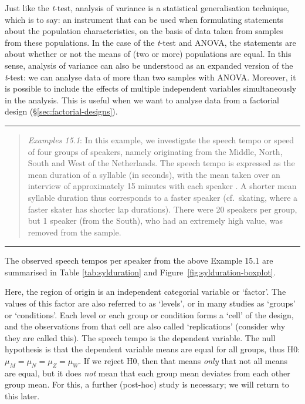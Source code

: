 \documentclass[
]{book}
\begin{document}
Just like the \emph{t}-test, analysis of variance is a statistical generalisation
technique, which is to say: an instrument that can be used
when formulating statements about the population characteristics,
on the basis of data taken from samples from these populations.
In the case of the \emph{t}-test and ANOVA, the statements are about
whether or not the means of (two or more) populations are equal.
In this sense, analysis of variance can also be understood as an
expanded version of the \emph{t}-test: we can analyse data
of more than two samples with ANOVA. Moreover, it is possible to include the effects
of multiple independent variables simultaneously in the analysis. This is useful
when we want to analyse data from a factorial design
(§\ref{sec:factorial-designs}).

\begin{center}\rule{0.5\linewidth}{0.5pt}\end{center}

\begin{quote}
\emph{Examples 15.1}: In this example, we investigate the speech tempo or
speed of four groups of speakers, namely originating from the Middle, North,
South and West of the Netherlands. The speech tempo is expressed as the mean
duration of a syllable (in seconds), with the mean taken over an interview of approximately
15 minutes with each speaker \citep{Quene08} \citep{R-hqmisc}.
A shorter mean syllable duration thus corresponds to a faster speaker (cf.~skating, where a faster skater has shorter lap durations). There were 20
speakers per group, but 1 speaker (from the South), who had an extremely high value,
was removed from the sample.
\end{quote}

\begin{center}\rule{0.5\linewidth}{0.5pt}\end{center}

The observed speech tempos per speaker from the above Example 15.1 are summarised
in Table \ref{tab:sylduration} and Figure~\ref{fig:sylduration-boxplot}.

Here, the region of origin is an independent categorial variable or `factor'.
The values of this factor are also referred to as `levels', or in many studies
as `groups' or `conditions'. Each level or each group or condition forms
a `cell' of the design, and the observations from that cell are also
called `replications' (consider why they are called this).
The speech tempo is the dependent variable. The null hypothesis is that the dependent variable means are equal for all groups, thus
H0: \(\mu_M = \mu_N = \mu_Z = \mu_W\). If we reject H0, then that means
\emph{only} that not all means are equal, but it does \emph{not} mean that each group mean deviates from each other group mean. For this, a further (post-hoc)
study is necessary; we will return to this later.
\end{document}
